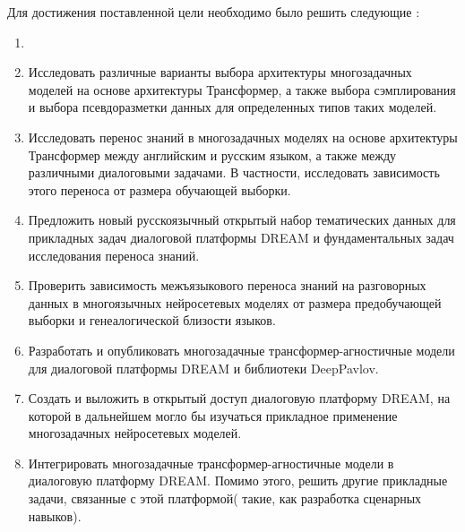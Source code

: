 Для достижения поставленной цели необходимо было решить следующие {\tasks}:
\begin{enumerate}

  \item 
  \item Исследовать различные варианты выбора архитектуры многозадачных моделей на основе архитектуры Трансформер, а также выбора сэмплирования и выбора псевдоразметки данных для определенных типов таких моделей.
  \item Исследовать перенос знаний в многозадачных моделях на основе архитектуры Трансформер между английским и русским языком, а также между различными диалоговыми задачами. В частности, исследовать зависимость этого переноса от размера обучающей выборки.
  
  \item Предложить новый русскоязычный открытый набор тематических данных для прикладных задач диалоговой платформы DREAM и фундаментальных задач исследования переноса знаний.
  \item Проверить зависимость межъязыкового переноса знаний на разговорных данных в многоязычных нейросетевых моделях от размера предобучающей выборки и генеалогической близости языков.
  \item Разработать и опубликовать многозадачные трансформер-агностичные модели для диалоговой платформы DREAM и библиотеки DeepPavlov.
  
  \item Создать и выложить в открытый доступ диалоговую платформу DREAM, на которой в дальнейшем могло бы изучаться прикладное применение многозадачных нейросетевых моделей.
  
  \item Интегрировать многозадачные трансформер-агностичные модели в диалоговую платформу DREAM. Помимо этого, решить другие прикладные задачи, связанные с этой платформой( такие, как разработка сценарных навыков).
  \newline
  \newline
\end{enumerate}

